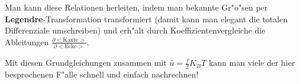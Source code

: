 \abs
Man kann diese Relationen herleiten, indem man bekannte Gr"o"sen per
\textbf{Legendre}-Transformation transformiert (damit kann man elegant
die totalen Differenziale umschreiben) und erh"alt durch
Koeffizientenvergleiche die Ableitungen $\frac{\partial
  <\text{Kante}>}{\partial <\text{Ecke}>}$.

Mit diesen Grundgleichungen zusammen mit $\bar u = \frac{f}{2} K_B T$
kann man viele der hier besprochenen F"alle schnell und einfach nachrechnen!





















